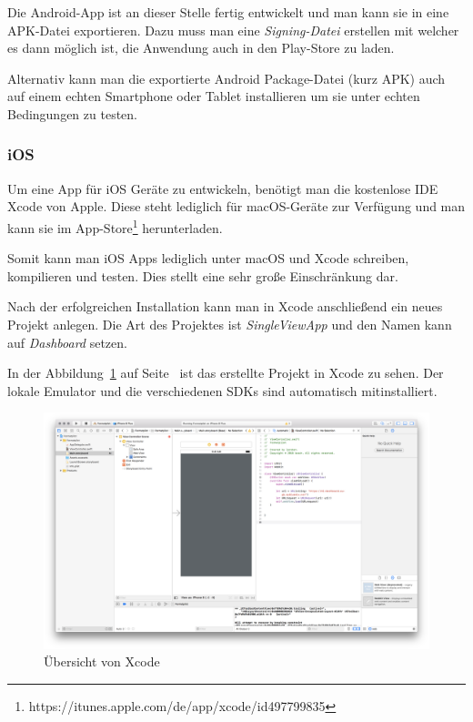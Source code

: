 Die Android-App ist an dieser Stelle fertig entwickelt und man kann sie in eine APK-Datei exportieren. Dazu muss man
eine \textit{Signing-Datei} erstellen mit welcher es dann möglich ist, die Anwendung auch in den Play-Store zu laden.

Alternativ kann man die exportierte Android Package-Datei (kurz APK) auch auf einem echten Smartphone oder Tablet
installieren um sie unter echten Bedingungen zu testen.

\subsubsection{iOS}
Um eine App für iOS Geräte zu entwickeln, benötigt man die kostenlose IDE Xcode von Apple. Diese steht lediglich für
macOS-Geräte zur Verfügung und man kann sie im
App-Store\footnote{https://itunes.apple.com/de/app/xcode/id497799835} herunterladen.

Somit kann man iOS Apps lediglich unter macOS und Xcode schreiben, kompilieren und testen. Dies stellt eine sehr große
Einschränkung dar.

Nach der erfolgreichen Installation kann man in Xcode anschließend ein neues Projekt anlegen. Die Art des Projektes ist
\textit{SingleViewApp} und den Namen kann auf \textit{Dashboard} setzen.

In der Abbildung~\ref{fig:umsetzung_ios_ide} auf Seite~\pageref{fig:umsetzung_ios_ide} ist das erstellte Projekt in
Xcode zu sehen. Der lokale Emulator und die verschiedenen SDKs sind automatisch mitinstalliert.

\begin{figure}[h]
    \centering
    \includegraphics[width=\textwidth]{images/kapitel_4/ios_ide.png}
    \caption{Übersicht von Xcode}
    \label{fig:umsetzung_ios_ide}
\end{figure}

